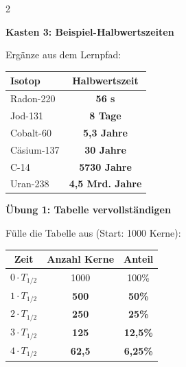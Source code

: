 \documentclass[10pt, a4paper]{article}
\newcommand{\fachfarbe}{physik}
\newcommand{\lsg}[1]{\textcolor{loesung}{\textbf{#1}}}
\newcommand{\abschnitt}[1]{%
    \vspace{8pt}\noindent\textbf{\textcolor{\fachfarbe}{#1}}\vspace{4pt}
}
\begin{document}
\begin{multicols}{2}
\vspace{6pt}


\abschnitt{Kasten 3: Beispiel-Halbwertszeiten}

\begin{merksatz}[Übersicht]
Ergänze aus dem Lernpfad:

\vspace{4pt}
\renewcommand{\arraystretch}{1.4}
\begin{tabular}{|l|c|}
\hline
\textbf{Isotop} & \textbf{Halbwertszeit} \\
\hline
Radon-220 & \lsg{56 s} \\
\hline
Jod-131 & \lsg{8 Tage} \\
\hline
Cobalt-60 & \lsg{5,3 Jahre} \\
\hline
Cäsium-137 & \lsg{30 Jahre} \\
\hline
C-14 & \lsg{5730 Jahre} \\
\hline
Uran-238 & \lsg{4,5 Mrd. Jahre} \\
\hline
\end{tabular}
\renewcommand{\arraystretch}{1}
\end{merksatz}

\columnbreak


\abschnitt{Übung 1: Tabelle vervollständigen}

Fülle die Tabelle aus (Start: 1000 Kerne):

\vspace{4pt}
\renewcommand{\arraystretch}{1.4}
\begin{tabular}{|c|c|c|}
\hline
\textbf{Zeit} & \textbf{Anzahl Kerne} & \textbf{Anteil} \\
\hline
$0 \cdot T_{1/2}$ & 1000 & 100\% \\
\hline
$1 \cdot T_{1/2}$ & \lsg{500} & \lsg{50\%} \\
\hline
$2 \cdot T_{1/2}$ & \lsg{250} & \lsg{25\%} \\
\hline
$3 \cdot T_{1/2}$ & \lsg{125} & \lsg{12,5\%} \\
\hline
$4 \cdot T_{1/2}$ & \lsg{62,5} & \lsg{6,25\%} \\
\hline
\end{tabular}
\renewcommand{\arraystretch}{1}


\end{multicols}
\end{document}
